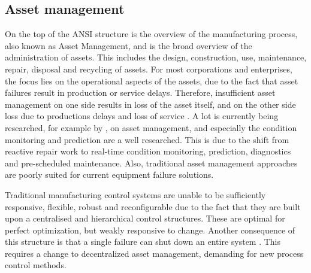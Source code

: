 	 


\subsection{Asset management}
On the top of the ANSI structure is the overview of the manufacturing process, also known as Asset Management, and is the broad overview of the administration of assets. This includes the design, construction, use, maintenance, repair, disposal and recycling of assets. For most corporations and enterprises, the focus lies on the operational aspects of the assets, due to the fact that asset failures result in production or service delays. Therefore, insufficient asset management on one side results in loss of the asset itself, and on the other side loss due to productions delays and loss of service \citep{trappey2013multi}.  A lot is currently being researched, for example by \citet{leitao2009agent}, on asset management, and especially the condition monitoring and prediction are a well researched. This is due to the shift from reactive repair work to real-time condition monitoring, prediction, diagnostics and pre-scheduled maintenance. Also, traditional asset management approaches are poorly suited for current equipment failure solutions. %
	
Traditional manufacturing control systems are unable to be sufficiently responsive, flexible, robust and reconfigurable due to the fact that they are built upon a centralised and hierarchical control structures. These are optimal for perfect optimization, but weakly responsive to change. Another consequence of this structure is that a single failure can shut down an entire system \citep{leitao2009agent}. This requires a change to decentralized asset management, demanding for new process control methods.
	
	
